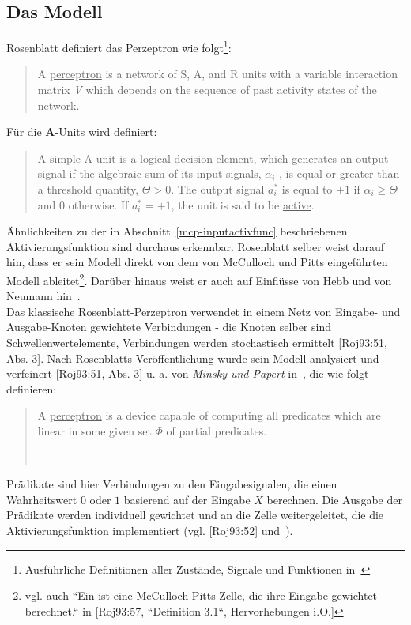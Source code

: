 \subsection{Das Modell}

Rosenblatt definiert das Perzeptron wie folgt\footnote{
    Ausführliche Definitionen aller Zustände, Signale und Funktionen in~\cite[79 - 94]{Ros62}
}:

\blockquote[{\cite[83 ``DEFINITION 17`` (Hervorhebung i.O.)]{Ros62}}]{
    A \underline{perceptron} is a network of S, A, and R units with a variable interaction matrix \textit{V} which depends on the
    sequence of past activity states of the network.
}

Für die \textbf{A}-Units wird definiert:

\blockquote[{\cite[81  ``DEFINITION 9`` (Hervorhebung i.O.)]{Ros62}}]{
    A \underline{simple A-unit} is a logical decision element, which
    generates an output signal if the algebraic sum of its
    input signals, $\alpha_i$ , is equal or greater than a threshold
    quantity, $\Theta > 0$. The output signal $a^*_i$ is equal to $+1$ if $\alpha_i \geq \Theta$ and $0$ otherwise. If $a^*_i = +1$,
    the unit is said to be \underline{active}.
}


Ähnlichkeiten zu der in Abschnitt~\ref{mcp-inputactivfunc} beschriebenen Aktivierungsfunktion sind durchaus erkennbar.
Rosenblatt selber weist darauf hin, dass er sein Modell direkt von dem von McCulloch und Pitts eingeführten Modell ableitet\footnote{
    vgl. auch ``Ein  ist eine McCulloch-Pitts-Zelle, die ihre Eingabe gewichtet berechnet.`` in [Roj93:57, ``Definition 3.1``, Hervorhebungen i.O.]
}. Darüber hinaus weist er auch auf Einflüsse von Hebb und von Neumann hin~\cite[5]{Ros62}.\\


Das klassische Rosenblatt-Perzeptron verwendet in einem Netz von Eingabe- und Ausgabe-Knoten gewichtete Verbindungen - die Knoten selber sind Schwellenwertelemente, Verbindungen werden stochastisch ermittelt [Roj93:51, Abs. 3].
Nach Rosenblatts Veröffentlichung wurde sein Modell analysiert und verfeinert [Roj93:51, Abs. 3] u. a. von \textit{Minsky und Papert} in~\cite{MP88}, die wie folgt definieren:

\blockquote[{~\cite[12, Hervorhebung i.O.]{MP88}}]{
    A \underline{perceptron} is a device capable of computing all predicates which are linear in some given set $\Phi$ of partial predicates.
}

Prädikate sind hier Verbindungen zu den Eingabesignalen, die einen Wahrheitswert $0$ oder $1$ basierend auf der Eingabe $X$ berechnen.
Die Ausgabe der Prädikate werden individuell gewichtet und an die Zelle weitergeleitet, die die Aktivierungsfunktion implementiert (vgl. [Roj93:52] und~\cite[8-12]{MP88}).


